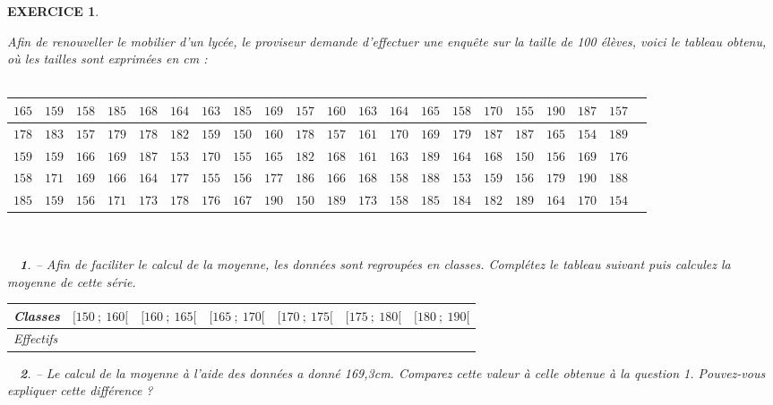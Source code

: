 \documentclass[a4paper]{article}   %
\renewcommand{\(}{\left(}
\renewcommand{\)}{\right)}
\newtheorem{ques}{~}
\newenvironment{qu}{\begin{ques}--} {\end{ques}}
\newtheorem{EXO}{\large EXERCICE }
\newenvironment{EX}   { \setcounter{ques}{0} \begin{EXO} \hrulefill ~\vspace{0.3cm}

\normalfont}    {\end{EXO} \medskip}
\begin{document}
\begin{EX}
Afin de renouveller le mobilier d'un lycée, le proviseur demande d'effectuer une enquête sur la taille de 100 élèves, voici le tableau obtenu, où les tailles sont exprimées en cm :\\
~~\\
\begin{center}
\begin{tabular}{|p{0.5cm}| p{0.5cm}|p{0.5cm}|p{0.5cm}|p{0.5cm}|p{0.5cm}|p{0.5cm}|p{0.5cm}|p{0.5cm}|p{0.5cm}|p{0.5cm}|p{0.5cm}|p{0.5cm}|p{0.5cm}|p{0.5cm}|p{0.5cm}|p{0.5cm}|p{0.5cm}|p{0.5cm}|p{0.5cm}|p{0.5cm}|}
\hline
$165$&$159$&$158$&$185$&$168$&$164$&$163$&$185$&$169$&$157$&$160$&$163$&$164$&$165$&$158$&$170$&$155$&$190$&$187$&$157$\\
\hline
$178$&$183$&$157$&$179$&$178$&$182$&$159$&$150$&$160$&$178$&$157$&$161$&$170$&$169$&$179$&$187$&$187$&$165$&$154$&$189$\\
\hline
$159$&$159$&$166$&$169$&$187$&$153$&$170$&$155$&$165$&$182$&$168$&$161$&$163$&$189$&$164$&$168$&$150$&$156$&$169$&$176$\\
\hline
$158$&$171$&$169$&$166$&$164$&$177$&$155$&$156$&$177$&$186$&$166$&$168$&$158$&$188$&$153$&$159$&$156$&$179$&$190$&$188$\\
\hline
$185$&$159$&$156$&$171$&$173$&$178$&$176$&$167$&$190$&$150$&$189$&$173$&$158$&$185$&$184$&$182$&$189$&$164$&$170$&$154$\\
\hline
\end{tabular}
\end{center}
~~\\
\begin{qu} Afin de faciliter le calcul de la moyenne, les données sont regroupées en classes. Complétez le tableau suivant puis calculez la moyenne de cette série.
\begin{center}
\begin{tabular}{|p{3cm}| p{2cm}|p{2cm}|p{2cm}|p{2cm}|p{2cm}|p{2cm}|}		
\hline							%
Classes & $[150~;~160[$&$[160~;~165[$&$[165~;~170[$&$[170~;~175[$&$[175~;~180[$&$[180~;~190[$ \\
\hline
Effectifs&&&&&&\\
\hline
\end{tabular}
\end{center}
\end{qu}

\begin{qu} Le calcul de la moyenne à l'aide des données a donné 169,3cm. Comparez cette valeur à celle obtenue à la question 1. Pouvez-vous expliquer cette différence ?
\end{qu}

\end{EX}
\end{document}
